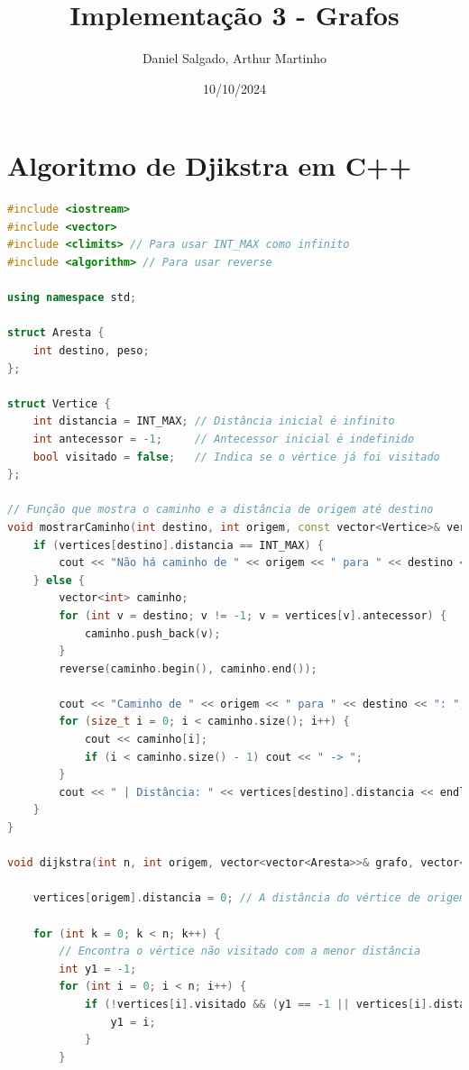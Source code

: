 \documentclass{article}
\title{Implementação 3 - Grafos }
\author{Daniel Salgado, Arthur Martinho }
\begin{document}
\date{10/10/2024}
\maketitle



\section{Algoritmo de Djikstra em C++}


\begin{lstlisting}[language=c++ ,caption = Exemplo C++]
#include <iostream>
#include <vector>
#include <climits> // Para usar INT_MAX como infinito
#include <algorithm> // Para usar reverse

using namespace std;

struct Aresta {
    int destino, peso;
};

struct Vertice {
    int distancia = INT_MAX; // Distância inicial é infinito
    int antecessor = -1;     // Antecessor inicial é indefinido
    bool visitado = false;   // Indica se o vértice já foi visitado
};

// Função que mostra o caminho e a distância de origem até destino
void mostrarCaminho(int destino, int origem, const vector<Vertice>& vertices) {
    if (vertices[destino].distancia == INT_MAX) {
        cout << "Não há caminho de " << origem << " para " << destino << endl;
    } else {
        vector<int> caminho;
        for (int v = destino; v != -1; v = vertices[v].antecessor) {
            caminho.push_back(v);
        }
        reverse(caminho.begin(), caminho.end());

        cout << "Caminho de " << origem << " para " << destino << ": ";
        for (size_t i = 0; i < caminho.size(); i++) {
            cout << caminho[i];
            if (i < caminho.size() - 1) cout << " -> ";
        }
        cout << " | Distância: " << vertices[destino].distancia << endl;
    }
}

void dijkstra(int n, int origem, vector<vector<Aresta>>& grafo, vector<Vertice>& vertices) {
    
    vertices[origem].distancia = 0; // A distância do vértice de origem para ele mesmo é 0

    for (int k = 0; k < n; k++) {
        // Encontra o vértice não visitado com a menor distância
        int y1 = -1;
        for (int i = 0; i < n; i++) {
            if (!vertices[i].visitado && (y1 == -1 || vertices[i].distancia < vertices[y1].distancia)) {
                y1 = i;
            }
        }


\end{lstlisting}
\end{document}
